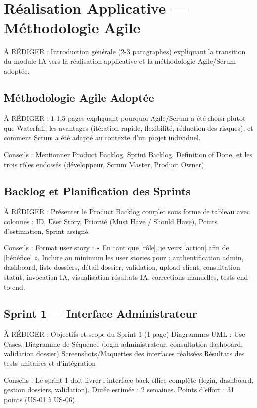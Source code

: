 \chapter{Réalisation Applicative --- Méthodologie Agile}
\label{chap:realisation-agile}

À RÉDIGER : Introduction générale (2-3 paragraphes) expliquant la transition du module IA vers la réalisation applicative et la méthodologie Agile/Scrum adoptée.

\section{Méthodologie Agile Adoptée}

À RÉDIGER : 1-1,5 pages expliquant pourquoi Agile/Scrum a été choisi plutôt que Waterfall, les avantages (itération rapide, flexibilité, réduction des risques), et comment Scrum a été adapté au contexte d'un projet individuel.

Conseils : Mentionner Product Backlog, Sprint Backlog, Definition of Done, et les trois rôles endossés (développeur, Scrum Master, Product Owner).

\section{Backlog et Planification des Sprints}

À RÉDIGER : Présenter le Product Backlog complet sous forme de tableau avec colonnes : ID, User Story, Priorité (Must Have / Should Have), Points d'estimation, Sprint assigné.

Conseils : Format user story : « En tant que [rôle], je veux [action] afin de [bénéfice] ». 
Inclure au minimum les user stories pour : authentification admin, dashboard, liste dossiers, détail dossier, validation, upload client, consultation statut, invocation IA, visualisation résultats IA, corrections manuelles, tests end-to-end.

\section{Sprint 1 --- Interface Administrateur}

À RÉDIGER : Objectifs et scope du Sprint 1 (1 page)
Diagrammes UML : Use Cases, Diagramme de Séquence (login administrateur, consultation dashboard, validation dossier)
Screenshots/Maquettes des interfaces réalisées
Résultats des tests unitaires et d'intégration

Conseils : Le sprint 1 doit livrer l'interface back-office complète (login, dashboard, gestion dossiers, validation). Durée estimée : 2 semaines. Points d'effort : 31 points (US-01 à US-06).

